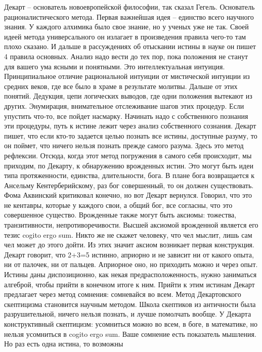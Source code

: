 \documentclass[a4paper, 12pt]{article}
\begin{document}
Декарт -- основатель новоевропейской философии, так сказал Гегель. 
Основатель рационалистического метода. Первая важнейшая идея -- единство 
всего научного знания. У каждого алхимика было свое знание, но у ученых 
уже не так. Своей идеей метода универсального он излагает в произведения 
правила чего-то там плохо сказано. И дальше в рассуждениях об отыскании 
истины в науке он пишет 4 правила основных. Анализ надо вести до тех 
пор, пока положения не станут для вашего ума ясными и понятными. Это 
интеллектуальная интуиция. Принципиальное отличие рациональной интуиции 
от мистической интуиции из средних веков, где все было в храме 
в результате молитвы. Дальше от этих понятий. Дедукция, цепи логических 
выводов, где одни положения вытекают из других. Энумирация, внимательное 
отслеживание шагов этих процедур. Если упустить что-то, все пойдет 
насмарку. Начинать надо с собственного познания эти процедуры, путь 
к истине лежит через анализ собственного сознания. Декарт пишет, что 
если кто-то задается целью познать все истины, доступные разуму, то он 
поймет, что ничего нельзя познать прежде самого разума. Здесь это метод 
рефлексии. Отсюда, когда этот метод погружения в самого себя происходит, 
мы приходим, по Декарту, к обнаружению врожденных истин. Это могут быть 
идеи типа протяженности, единства, длительности, бога. В плане бога 
возвращается к Ансельму Кентерберийскому, раз бог совершенный, то он 
должен существовать. Фома Аквинский критиковал конечно, но вот Декарт 
вернулся. Говорил, что это не кентавры, которые у каждого свои, а общий 
бог, все согласны, что это совершенное существо. Врожденные также могут 
быть аксиомы: тожества, транзитивности, непротиворечивости. Высшей 
аксиомой врожденной является его тезис cogito ergo sum. Никто же не 
скажет человеку, что чел мыслит, лишь сам чел может до этого дойти. Из 
этих значит аксиом возникает первая конструкция. Декарт говорит, что 
2+3=5 истинно, априорно и не зависит ни от какого опыта, ни от палочек, 
ни от пальцев. Априорное оно, но приходить можно и через опыт. Истины 
даны диспозиционно, как некая предрасположенность, нужно заниматься 
алгеброй, чтобы прийти в конечном итоге к ним. Прийти к этим истинам 
Декарт предлагает через метод сомнения: сомневайся во всем. Метод 
Декартовского скептицизма становится научным методом. Школа скептиков из 
античности была разрушительной, ничего нельзя познать, и лучше помолчать 
вообще. У Декарта конструктивный скептицизм: усомниться можно во всем, 
в боге, в математике, но нельзя усомниться в cogito ergo sum. Ваше 
сомнение есть показатель мышления. Но раз есть одна истина, то возможны 
\end{document}
